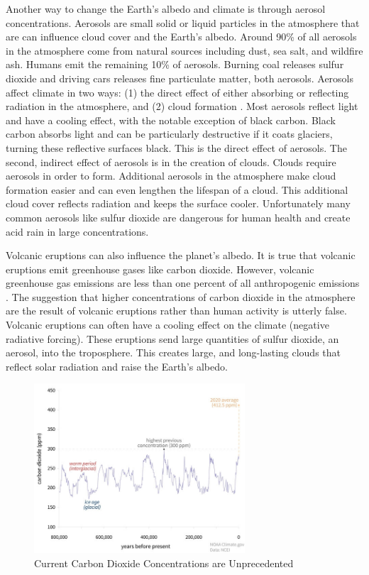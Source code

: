 Another way to change the Earth's albedo and climate is through aerosol concentrations. Aerosols are small solid or liquid particles in the atmosphere that are can influence cloud cover and the Earth's albedo. Around 90\% of all aerosols in the atmosphere come from natural sources including dust, sea salt, and  wildfire ash. Humans emit the remaining 10\% of aerosols. Burning coal releases sulfur dioxide and driving cars releases fine particulate matter, both aerosols. Aerosols affect climate in two ways: (1) the direct effect of either absorbing or reflecting radiation in the atmosphere, and (2) cloud formation \citep{gfdl}. Most aerosols reflect light and have a cooling effect, with the notable exception of black carbon. Black carbon absorbs light and can be particularly destructive if it coats glaciers, turning these reflective surfaces black. This is the direct effect of aerosols. The second, indirect effect of aerosols is in the creation of clouds. Clouds require aerosols in order to form. Additional aerosols in the atmosphere make cloud formation easier and can even lengthen the lifespan of a cloud. This additional cloud cover reflects radiation and keeps the surface cooler. Unfortunately many common aerosols like sulfur dioxide are dangerous for human health and create acid rain in large concentrations. 

Volcanic eruptions can also influence the planet's albedo. It is true that volcanic eruptions emit greenhouse gases like carbon dioxide. However, volcanic greenhouse gas emissions are less than one percent of all anthropogenic emissions \citep{usgs, gerlach2011volcanic}. The suggestion that higher concentrations of carbon dioxide in the atmosphere are the result of volcanic eruptions rather than human activity is utterly false. Volcanic eruptions can often have a cooling effect on the climate (negative radiative forcing). These eruptions send large quantities of sulfur dioxide, an aerosol, into the troposphere. This creates large, and long-lasting clouds that reflect solar radiation and raise the Earth's albedo. 

\begin{figure}
	\caption{Current Carbon Dioxide Concentrations are Unprecedented \citep{noaa1} \label{noaa1}}
	\centering
	\includegraphics[width=0.7\textwidth]{figures/chapter1_figures/co2_noaa.jpg}
\end{figure}

